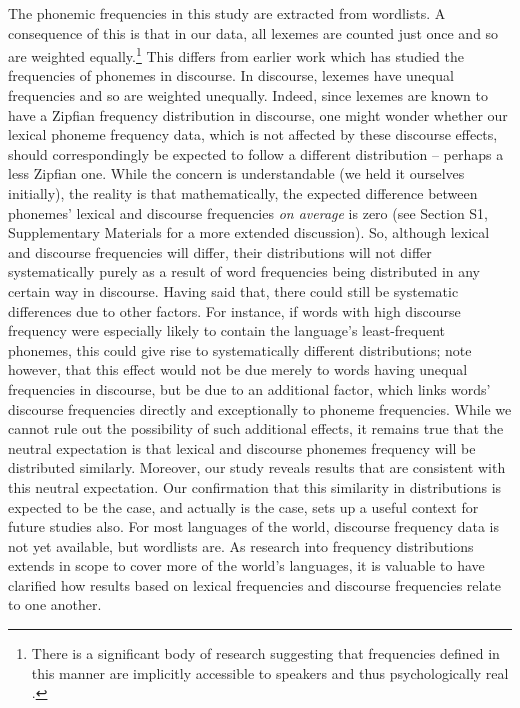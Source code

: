 The phonemic frequencies in this study are extracted from wordlists. A consequence of this is that in our data, all lexemes are counted just once and so are weighted equally.\footnote{There is a significant body of research suggesting that frequencies defined in this manner are implicitly accessible to speakers and thus psychologically real \autocites[for example,][]{coleman_stochastic_1997}{zuraw_patterned_2000}{ernestus_predicting_2003}{albright_rules_2003}{eddington_spanish_2004}{hayes_stochastic_2006}.} This differs from earlier work which has studied the frequencies of phonemes in discourse. In discourse, lexemes have unequal frequencies and so are weighted unequally. Indeed, since lexemes are known to have a Zipfian frequency distribution in discourse, one might wonder whether our lexical phoneme frequency data, which is not affected by these discourse effects, should correspondingly be expected to follow a different distribution -- perhaps a less Zipfian one. While the concern is understandable (we held it ourselves initially), the reality is that mathematically, the expected difference between phonemes' lexical and discourse frequencies \emph{on average} is zero (see Section S1, Supplementary Materials for a more extended discussion). So, although lexical and discourse frequencies will differ, their distributions will not differ systematically purely as a result of word frequencies being distributed in any certain way in discourse. Having said that, there could still be systematic differences due to other factors. For instance, if words with high discourse frequency were especially likely to contain the language's least-frequent phonemes, this could give rise to systematically different distributions; note however, that this effect would not be due merely to words having unequal frequencies in discourse, but be due to an additional factor, which links words' discourse frequencies directly and exceptionally to phoneme frequencies. While we cannot rule out the possibility of such additional effects, it remains true that the neutral expectation is that lexical and discourse phonemes frequency will be distributed similarly. Moreover, our study reveals results that are consistent with this neutral expectation. Our confirmation that this similarity in distributions is expected to be the case, and actually is the case, sets up a useful context for future studies also. For most languages of the world, discourse frequency data is not yet available, but wordlists are. As research into frequency distributions extends in scope to cover more of the world's languages, it is valuable to have clarified how results based on lexical frequencies and discourse frequencies relate to one another.

